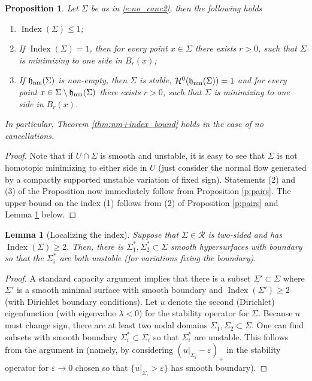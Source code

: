 \documentclass[12pt,twoside]{amsart}
\numberwithin{equation}{section}
\renewcommand{\leq}{\leqslant}
\renewcommand{\geq}{\geqslant}
\newtheorem{lemma}[theorem]{Lemma}
\newtheorem{proposition}[theorem]{Proposition}
\renewcommand{\cH}{\mathcal H}
\renewcommand{\cR}{\mathcal R}
\newcommand{\eps}{\varepsilon}
\DeclareMathOperator{\Index}{Index}
\DeclareMathOperator{\hnm}{\mathfrak{h}_\textnormal{nm}}
\begin{document}
\begin{proposition}
\label{p:def_thm}
Let $\Sigma$ be as in \eqref{e:no_canc2}, then the following holds
\begin{enumerate}
    \item $\Index(\Sigma)\leq 1$;
    \item If $\Index(\Sigma)=1$, then 
 for every point $x \in \Sigma$ there exists $r>0$, such that
$\Sigma$ is minimizing to one side in $B_r(x)$;
    \item If $\hnm(\Sigma)$ is non-empty, then $\Sigma$ is stable,
    $\cH^0(\hnm(\Sigma))=1$ and for every point $x \in \Sigma\setminus \hnm(\Sigma)$ there exists $r>0$, such that $\Sigma$ is minimizing to one side in $B_r(x)$.
\end{enumerate}
In particular, Theorem \ref{thm:nm+index_bound} holds in the case of no cancellations.
\end{proposition}
	
\begin{proof} 
Note that if $U \cap \Sigma$ is smooth and unstable, it is easy to see that $\Sigma$ is not homotopic minimizing to either side in $U$ (just consider the normal flow generated by a compactly supported unstable variation of fixed sign). Statements (2) and (3)
of the Proposition now immediately follow from Proposition \ref{p:pairs}. 
The upper bound on the index (1) follows from (2) of Proposition \ref{p:pairs} and Lemma \ref{l:localizing-index-two-sided} below. 
\end{proof}	
\begin{lemma}[Localizing the index]\label{l:localizing-index-two-sided}
Suppose that $\Sigma \in \cR$ is two-sided and has $\Index(\Sigma) \geq 2$. Then, there is $\Sigma^*_1,\Sigma^*_2 \subset \Sigma$ smooth hypersurfaces with boundary so that the $\Sigma^*_i$ are both unstable (for variations fixing the boundary). 
\end{lemma}
\begin{proof}
A standard capacity argument implies that there is a subset $\Sigma' \subset \Sigma$ where $\Sigma'$ is a smooth minimal surface with smooth boundary and $\Index(\Sigma') \geq 2$ (with Dirichlet boundary conditions). Let $u$ denote the second (Dirichlet) eigenfunction (with eigenvalue $\lambda <0$) for the stability operator for $\Sigma$. Because $u$ must change sign, there are at least two nodal domains $\Sigma_1,\Sigma_2\subset \Sigma$. One can find subsets with smooth boundary $\Sigma^*_i\subset \Sigma_i$ so that $\Sigma^*_i$ are unstable. This follows from the argument in \cite[p.\ 21]{Chavel} (namely, by considering $(u|_{\Sigma_i} - \eps)_+$ in the stability operator for $\eps\to 0$ chosen so that $\{u|_{\Sigma_i} > \eps\}$ has smooth boundary). 
\end{proof}
\end{document}
